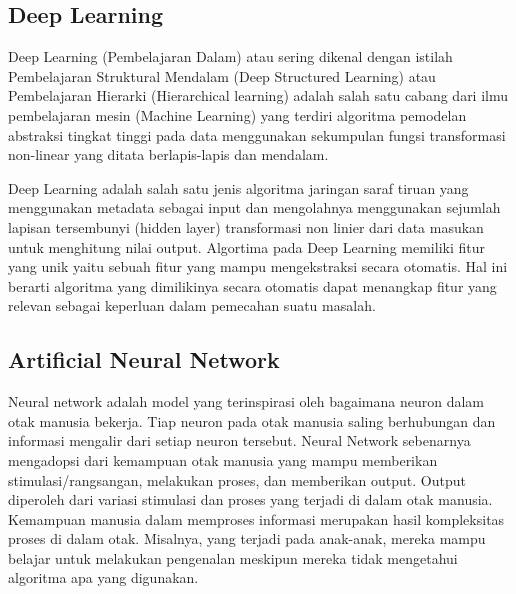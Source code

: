 \subsection{Deep Learning}
Deep Learning (Pembelajaran Dalam) atau sering dikenal dengan istilah Pembelajaran Struktural Mendalam (Deep Structured Learning) atau Pembelajaran Hierarki (Hierarchical learning) adalah salah satu cabang dari ilmu pembelajaran mesin (Machine Learning) yang terdiri algoritma pemodelan abstraksi tingkat tinggi pada data menggunakan sekumpulan fungsi transformasi non-linear yang ditata berlapis-lapis dan mendalam.

Deep Learning adalah salah satu jenis algoritma jaringan saraf tiruan yang menggunakan metadata sebagai input dan mengolahnya menggunakan sejumlah lapisan tersembunyi (hidden layer) transformasi non linier dari data masukan untuk menghitung nilai output. Algortima pada Deep Learning memiliki fitur yang unik yaitu sebuah fitur yang mampu mengekstraksi secara otomatis. Hal ini berarti algoritma yang dimilikinya secara otomatis dapat menangkap fitur yang relevan sebagai keperluan dalam pemecahan suatu masalah.

\subsection{Artificial Neural Network}
Neural network adalah model yang terinspirasi oleh bagaimana neuron dalam otak manusia bekerja. Tiap neuron pada otak manusia saling berhubungan dan informasi mengalir dari setiap neuron tersebut. Neural Network sebenarnya mengadopsi dari kemampuan otak manusia yang mampu memberikan stimulasi/rangsangan, melakukan proses, dan memberikan output. Output diperoleh dari variasi stimulasi dan proses yang terjadi di dalam otak manusia. Kemampuan manusia dalam memproses informasi merupakan hasil kompleksitas proses di dalam otak. Misalnya, yang terjadi pada anak-anak, mereka mampu belajar untuk melakukan pengenalan meskipun mereka tidak mengetahui algoritma apa yang digunakan.





